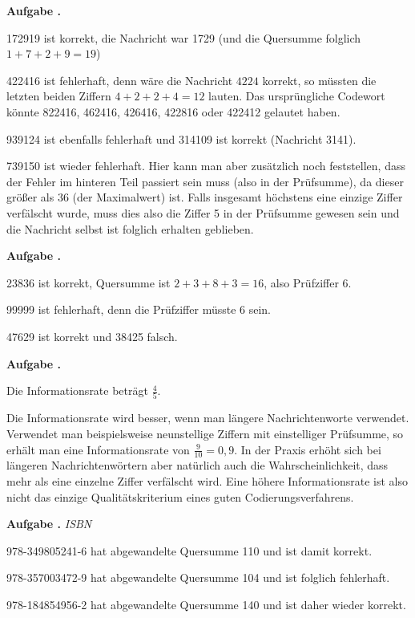 \documentclass[a4paper,ngerman,12pt]{scrartcl}
\theoremstyle{definition}
\theoremstyle{plain}
\theoremstyle{remark}
\newlength{\aufgabenskip}
\newcounter{aufgabennummer}
\newenvironment{aufgabe}[1]{
	\addtocounter{aufgabennummer}{1}
	\textbf{Aufgabe \theaufgabennummer.} \emph{#1} \par
}{\vspace{\aufgabenskip}}
\begin{document}
\begin{aufgabe}{}
	172919 ist korrekt, die Nachricht war 1729 (und die Quersumme folglich $1+7+2+9=19$)
	
	422416 ist fehlerhaft, denn wäre die Nachricht $4224$ korrekt, so müssten die letzten beiden Ziffern $4+2+2+4=12$ lauten. Das ursprüngliche Codewort könnte 822416, 462416, 426416, 422816 oder 422412 gelautet haben.
	
	939124 ist ebenfalls fehlerhaft und 314109 ist korrekt (Nachricht 3141).
	
	739150 ist wieder fehlerhaft. Hier kann man aber zusätzlich noch feststellen, dass der Fehler im hinteren Teil passiert sein muss (also in der Prüfsumme), da dieser größer als 36 (der Maximalwert) ist. Falls insgesamt höchstens eine einzige Ziffer verfälscht wurde, muss dies also die Ziffer 5 in der Prüfsumme gewesen sein und die Nachricht selbst ist folglich erhalten geblieben.
\end{aufgabe}

\begin{aufgabe}{}
	23836 ist korrekt, Quersumme ist $2+3+8+3=16$, also Prüfziffer $6$.
	
	99999 ist fehlerhaft, denn die Prüfziffer müsste $6$ sein.
	
	47629 ist korrekt und 38425 falsch.
\end{aufgabe}

\begin{aufgabe}{}
	Die Informationsrate beträgt $\frac{4}{5}$.
	
	Die Informationsrate wird besser, wenn man längere Nachrichtenworte verwendet. Verwendet man beispielsweise neunstellige Ziffern mit einstelliger Prüfsumme, so erhält man eine Informationsrate von $\frac{9}{10} = 0,9$. In der Praxis erhöht sich bei längeren Nachrichtenwörtern aber natürlich auch die Wahrscheinlichkeit, dass mehr als eine einzelne Ziffer verfälscht wird. Eine höhere Informationsrate ist also nicht das einzige Qualitätskriterium eines guten Codierungsverfahrens.
\end{aufgabe}

\begin{aufgabe}{ISBN}
	978-349805241-6 hat abgewandelte Quersumme 110 und ist damit korrekt.
	
	978-357003472-9 hat abgewandelte Quersumme 104 und ist folglich fehlerhaft.
	
	978-184854956-2 hat abgewandelte Quersumme 140 und ist daher wieder korrekt.
\end{aufgabe}
\end{document}
